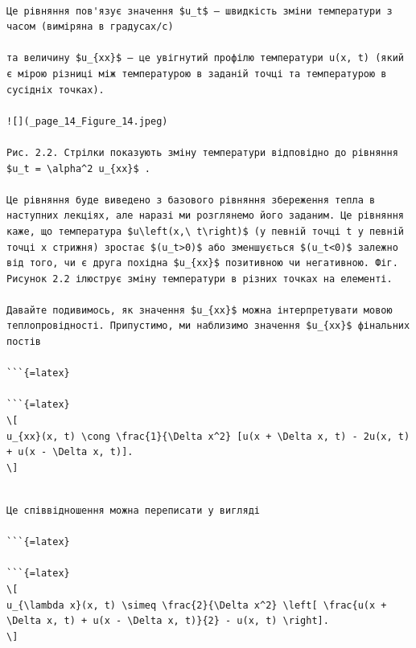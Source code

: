 \documentclass[
  ukrainian,
]{article}
\begin{document}
\begin{verbatim}

Це рівняння пов'язує значення $u_t$ — швидкість зміни температури з часом (виміряна в градусах/с)

та величину $u_{xx}$ — це увігнутий профілю температури u(x, t) (який є мірою різниці між температурою в заданій точці та температурою в сусідніх точках).

![](_page_14_Figure_14.jpeg)

Рис. 2.2. Стрілки показують зміну температури відповідно до рівняння $u_t = \alpha^2 u_{xx}$ .

Це рівняння буде виведено з базового рівняння збереження тепла в наступних лекціях, але наразі ми розглянемо його заданим. Це рівняння каже, що температура $u\left(x,\ t\right)$ (у певній точці t у певній точці x стрижня) зростає $(u_t>0)$ або зменшується $(u_t<0)$ залежно від того, чи є друга похідна $u_{xx}$ позитивною чи негативною. Фіг. Рисунок 2.2 ілюструє зміну температури в різних точках на елементі.

Давайте подивимось, як значення $u_{xx}$ можна інтерпретувати мовою теплопровідності. Припустимо, ми наблизимо значення $u_{xx}$ фінальних постів

```{=latex}

```{=latex}
\[
u_{xx}(x, t) \cong \frac{1}{\Delta x^2} [u(x + \Delta x, t) - 2u(x, t) + u(x - \Delta x, t)].
\]
\end{verbatim}

\begin{verbatim}

Це співвідношення можна переписати у вигляді

```{=latex}

```{=latex}
\[
u_{\lambda x}(x, t) \simeq \frac{2}{\Delta x^2} \left[ \frac{u(x + \Delta x, t) + u(x - \Delta x, t)}{2} - u(x, t) \right].
\]
\end{verbatim}
\end{document}
